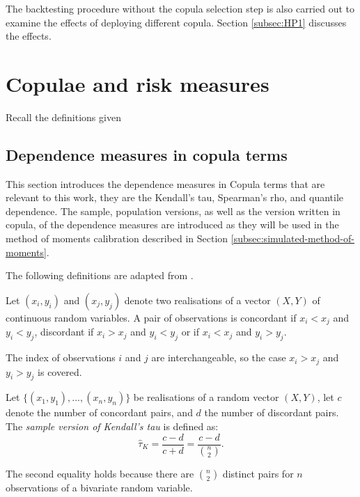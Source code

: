 The backtesting procedure without the copula selection step is also carried out to examine the effects of deploying different copula. 
Section \ref{subsec:HP1} discusses the effects. 

\section{Copulae and risk measures}\label{sec:crm}

Recall the definitions given 

\subsection{Dependence measures in copula terms}
This section introduces the dependence measures in Copula terms that are relevant to this work, 
they are the Kendall's tau, Spearman's rho, and quantile dependence. 
The sample, population versions, as well as the version written in copula, 
of the dependence measures are introduced as they will be used in the method of moments calibration described in Section \ref{subsec:simulated-method-of-moments}. 

The following definitions are adapted from \cite{Nelsen1999}. 

\begin{defi}[Concordance]
  Let $(x_i, y_i)$ and $(x_j, y_j)$ denote two realisations of a
  vector $(X, Y)$ of continuous random variables. 
  A pair of observations is concordant if $x_i<x_j$ and $y_i < y_j$, discordant if
  $x_i>x_j$ and $y_i < y_j$ or if $x_i<x_j$ and $y_i>y_j$. 
\end{defi}

The index of observations $i$ and $j$ are interchangeable, so the case
$x_i>x_j$ and $y_i>y_j$ is covered.

\begin{defi}
  Let $\{(x_1, y_1), ..., (x_n, y_n)\}$ be realisations of a random vector $(X, Y)$,
  let $c$ denote the number of concordant pairs, and $d$ the number of discordant pairs. 
  The {\em{sample version of Kendall's tau}} is defined as:
  \begin{equation*}
  \hat \tau_K = \frac{c-d}{c+d} = \frac{c-d}{\binom{n}{2}}. 
  \end{equation*}
  \end{defi} %

  The second equality holds because there are $\binom{n}{2}$ distinct pairs for $n$ observations of a bivariate random variable. 

